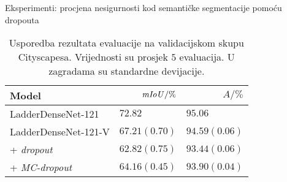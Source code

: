 \documentclass{beamer}
\begin{document}
\begin{frame}{Eksperimenti: procjena nesigurnosti kod semantičke segmentacije pomoću dropouta}	
	\begin{table}
		\centering\footnotesize
		\begin{tabular}{lrr}
			\toprule
			\bfseries Model & $\mathit{mIoU}/\%$ & $A/\%$ \\
			\midrule
			LadderDenseNet-121 \citep{Kreso:2017:LSDFSSLNI} & $72.82\phantom{(0.00)}$ & $95.06\phantom{(0.00)}$ \\
			\midrule
			LadderDenseNet-121-V & $67.21(0.70)$ & $94.59(0.06)$ \\
			+ \textit{dropout} & $62.82(0.75)$ & $93.44(0.06)$ \\
			+ \textit{MC-dropout} & $64.16(0.45)$ & $93.90(0.04)$
			\\\bottomrule
		\end{tabular}
		\caption{Usporedba rezultata evaluacije na validacijskom skupu Cityscapesa. Vrijednosti su prosjek $5$ evaluacija. U zagradama su standardne devijacije.}
		\label{tab:evaluacija-cityscapes}
	\end{table}
\end{frame}
\end{document}
